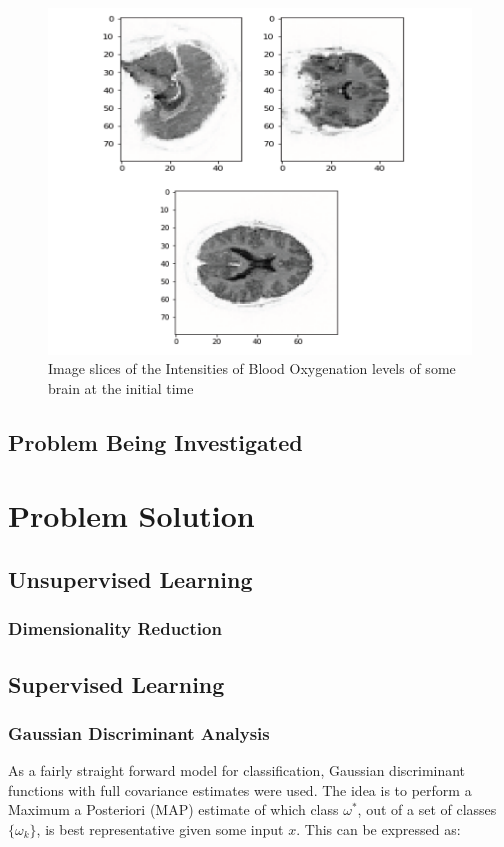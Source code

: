 \documentclass{article}[12pt]
\begin{document}
   \begin{figure}[!htb]
   	\centering
   	\includegraphics[scale=0.7]{brain_slices}
   	\caption{Image slices of the Intensities of Blood Oxygenation levels of some brain at the initial time}
   	\label{fig:brainSlice}
   \end{figure}
   
   \subsection{Problem Being Investigated}
   
   
   \section{Problem Solution}
   \subsection{Unsupervised Learning}
   \subsubsection{Dimensionality Reduction}
   \subsection{Supervised Learning}
   \subsubsection{Gaussian Discriminant Analysis}
   As a fairly straight forward model for classification, Gaussian discriminant functions with full covariance estimates were used. The idea is to perform a Maximum a Posteriori (MAP) estimate of which class $\omega^*$, out of a set of classes $\lbrace \omega_k \rbrace$, is best representative given some input $x$. This can be expressed as:
   
\end{document}
